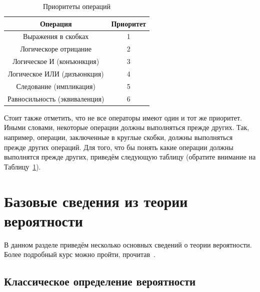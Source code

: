 \begin{table}[!ht]
\centering
\begin{tabular}{|c|c|}
\hline
Операция & Приоритет \\\hline 
Выражения в скобках & 1 \\
Логическоре отрицание & 2 \\
Логическое И (конъюнкция) & 3 \\
Логическое ИЛИ (дизъюнкция) & 4 \\
Следование (импликация) & 5 \\
Равносильность (эквиваленция) & 6\\\hline
\end{tabular}
\caption{Приоритеты операций}
\label{tab:priorities}
\end{table}

Стоит также отметить, что не все операторы имеют один и тот же 
приоритет. Иными словами, некоторые операции должны выполняться 
прежде других. Так, например, операции, заключенные в круглые скобки, 
должны выполняться прежде других операций. Для того, что бы понять
какие операции должны выполнятся прежде других, приведём следующую 
таблицу (обратите внимание на Таблицу~\ref{tab:priorities}).

\section{Базовые сведения из теории вероятности}

В данном разделе приведём несколько основных сведений о теории вероятности. 
Более подробный курс можно пройти, прочитав~\cite{turner:probability, kremer:probability}.

\subsection{Классическое определение вероятности}

